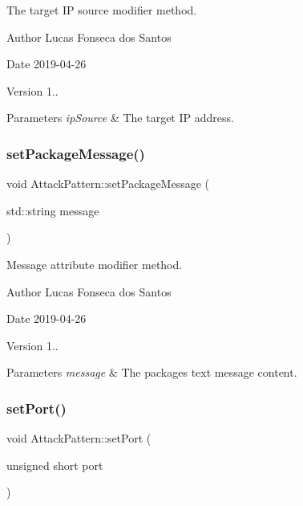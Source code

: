 The target IP source modifier method. \begin{DoxyAuthor}{Author}
Lucas Fonseca dos Santos 
\end{DoxyAuthor}
\begin{DoxyDate}{Date}
2019-\/04-\/26 
\end{DoxyDate}
\begin{DoxyVersion}{Version}
1..
\end{DoxyVersion}

\begin{DoxyParams}{Parameters}
{\em ip\+Source} & The target IP address. \\
\hline
\end{DoxyParams}
\mbox{\label{classAttackPattern_a34ff445145be8ef914fa4f30025b11cb}} 
\subsubsection{\texorpdfstring{set\+Package\+Message()}{setPackageMessage()}}
{\footnotesize\ttfamily void Attack\+Pattern\+::set\+Package\+Message (\begin{DoxyParamCaption}\item[{std\+::string}]{message }\end{DoxyParamCaption})}

Message attribute modifier method. \begin{DoxyAuthor}{Author}
Lucas Fonseca dos Santos 
\end{DoxyAuthor}
\begin{DoxyDate}{Date}
2019-\/04-\/26 
\end{DoxyDate}
\begin{DoxyVersion}{Version}
1..
\end{DoxyVersion}

\begin{DoxyParams}{Parameters}
{\em message} & The packages text message content. \\
\hline
\end{DoxyParams}
\mbox{\label{classAttackPattern_a5f1164d9f79b500d03e1e5ba10d02031}} 
\subsubsection{\texorpdfstring{set\+Port()}{setPort()}}
{\footnotesize\ttfamily void Attack\+Pattern\+::set\+Port (\begin{DoxyParamCaption}\item[{unsigned short}]{port }\end{DoxyParamCaption})}

